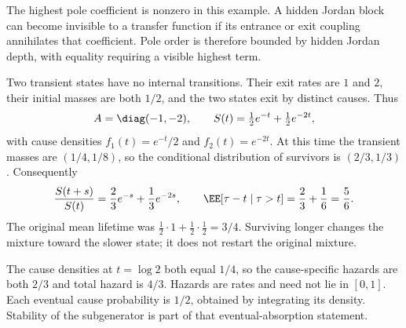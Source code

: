 The highest pole coefficient is nonzero in this example. A hidden Jordan block can become invisible to a transfer function if its entrance or exit coupling annihilates that coefficient. Pole order is therefore bounded by hidden Jordan depth, with equality requiring a visible highest term.

Two transient states have no internal transitions. Their exit rates are $1$ and $2$, their initial masses are both $1/2$, and the two states exit by distinct causes. Thus
\[
A=\diag(-1,-2),\qquad
S(t)=\tfrac12e^{-t}+\tfrac12e^{-2t},
\]
with cause densities $f_1(t)=e^{-t}/2$ and $f_2(t)=e^{-2t}$.
At this time the transient masses are $(1/4,1/8)$, so the conditional distribution of survivors is $(2/3,1/3)$. Consequently
\[
\frac{S(t+s)}{S(t)}=\frac23e^{-s}+\frac13e^{-2s},
\qquad
\EE[\tau-t\mid\tau>t]=\frac23+\frac16=\frac56.
\]
The original mean lifetime was $\tfrac12\cdot1+\tfrac12\cdot\tfrac12=3/4$. Surviving longer changes the mixture toward the slower state; it does not restart the original mixture.

The cause densities at $t=\log2$ both equal $1/4$, so the cause-specific hazards are both $2/3$ and total hazard is $4/3$. Hazards are rates and need not lie in $[0,1]$. Each eventual cause probability is $1/2$, obtained by integrating its density. Stability of the subgenerator is part of that eventual-absorption statement.

